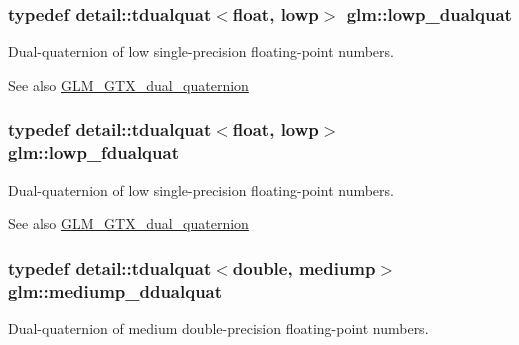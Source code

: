 \subsubsection[{\texorpdfstring{lowp\+\_\+dualquat}{lowp_dualquat}}]{\setlength{\rightskip}{0pt plus 5cm}typedef detail\+::tdualquat$<$float, lowp$>$ {\bf glm\+::lowp\+\_\+dualquat}}\hypertarget{group__gtc__dual__quaternion_gae1772179edc60f4e8b46c8772eeeccee}{}\label{group__gtc__dual__quaternion_gae1772179edc60f4e8b46c8772eeeccee}
Dual-\/quaternion of low single-\/precision floating-\/point numbers.

\begin{DoxySeeAlso}{See also}
\hyperlink{group__gtc__dual__quaternion}{G\+L\+M\+\_\+\+G\+T\+X\+\_\+dual\+\_\+quaternion} 
\end{DoxySeeAlso}
\subsubsection[{\texorpdfstring{lowp\+\_\+fdualquat}{lowp_fdualquat}}]{\setlength{\rightskip}{0pt plus 5cm}typedef detail\+::tdualquat$<$float, lowp$>$ {\bf glm\+::lowp\+\_\+fdualquat}}\hypertarget{group__gtc__dual__quaternion_gae62c636c63c9eb3c1ea6d10f4b7d7c81}{}\label{group__gtc__dual__quaternion_gae62c636c63c9eb3c1ea6d10f4b7d7c81}
Dual-\/quaternion of low single-\/precision floating-\/point numbers.

\begin{DoxySeeAlso}{See also}
\hyperlink{group__gtc__dual__quaternion}{G\+L\+M\+\_\+\+G\+T\+X\+\_\+dual\+\_\+quaternion} 
\end{DoxySeeAlso}
\subsubsection[{\texorpdfstring{mediump\+\_\+ddualquat}{mediump_ddualquat}}]{\setlength{\rightskip}{0pt plus 5cm}typedef detail\+::tdualquat$<$double, mediump$>$ {\bf glm\+::mediump\+\_\+ddualquat}}\hypertarget{group__gtc__dual__quaternion_ga62d8cbf30e2afd0b1044204268a69066}{}\label{group__gtc__dual__quaternion_ga62d8cbf30e2afd0b1044204268a69066}
Dual-\/quaternion of medium double-\/precision floating-\/point numbers.

